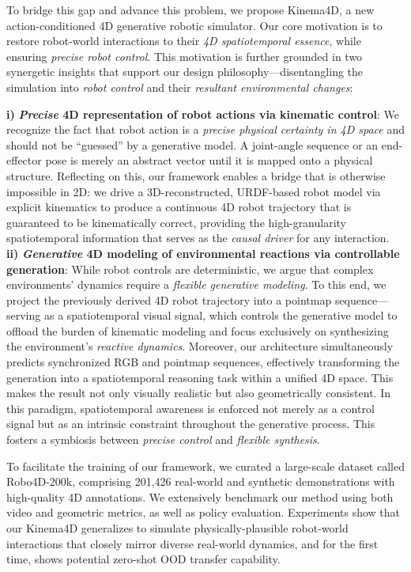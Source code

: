 To bridge this gap and advance this problem, we propose Kinema4D, a new action-conditioned 4D generative robotic simulator. Our core motivation is to restore robot-world interactions to their \textit{4D spatiotemporal essence}, while ensuring \textit{precise robot control}.
This motivation is further grounded in two synergetic insights that support our design philosophy—disentangling the simulation into \textit{robot control} and their \textit{resultant environmental changes}:

\textbf{i)} \textbf{\textit{Precise} 4D representation of robot actions via kinematic control}: We recognize the fact that robot action is a \textit{precise physical certainty in 4D space} and should not be “guessed” by a generative model. A joint-angle sequence or an end-effector pose is merely an abstract vector until it is mapped onto a physical structure. Reflecting on this, our framework enables a bridge that is otherwise impossible in 2D: we drive a 3D-reconstructed, URDF-based robot model via explicit kinematics to produce a continuous 4D robot trajectory that is guaranteed to be kinematically correct, providing the high-granularity spatiotemporal information that serves as the \textit{causal driver} for any interaction.
\textbf{ii)} \textbf{\textit{Generative} 4D modeling of environmental reactions via controllable generation}: While robot controls are deterministic, we argue that complex environments’ dynamics require a \textit{flexible generative modeling}. To this end, we project the previously derived 4D robot trajectory into a pointmap sequence—serving as a spatiotemporal visual signal, which controls the generative model to offload the burden of kinematic modeling and focus exclusively on synthesizing the environment's \textit{reactive dynamics}.
Moreover, our architecture simultaneously predicts synchronized RGB and pointmap sequences, effectively transforming the generation into a spatiotemporal reasoning task within a unified 4D space. This makes the result not only visually realistic but also geometrically consistent.
In this paradigm, spatiotemporal awareness is enforced not merely as a control signal but as an intrinsic constraint throughout the generative process. This fosters a symbiosis between \textit{precise control} and \textit{flexible synthesis}.

To facilitate the training of our framework, we curated a large-scale dataset called Robo4D-200k, comprising 201,426 real-world and synthetic demonstrations with high-quality 4D annotations.
We extensively benchmark our method using both video and geometric metrics, as well as policy evaluation. 
Experiments show that our Kinema4D generalizes to simulate physically-plausible robot-world interactions that closely mirror diverse real-world dynamics, and for the first time, shows potential zero-shot OOD transfer capability.

